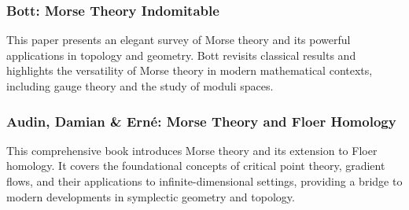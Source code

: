 \documentclass[10pt, letterpaper]{article}
\begin{document}
\subsubsection{Bott: Morse Theory Indomitable \cite{bott1988morse}} 
This paper presents an elegant survey of Morse theory and its powerful applications in topology and geometry. Bott revisits classical results and highlights the versatility of Morse theory in modern mathematical contexts, including gauge theory and the study of moduli spaces.

\subsubsection{Audin, Damian \& Erné: Morse Theory and Floer Homology \cite{audin2014morse}} 
This comprehensive book introduces Morse theory and its extension to Floer homology. It covers the foundational concepts of critical point theory, gradient flows, and their applications to infinite-dimensional settings, providing a bridge to modern developments in symplectic geometry and topology.










\printbibliography
\end{document}
